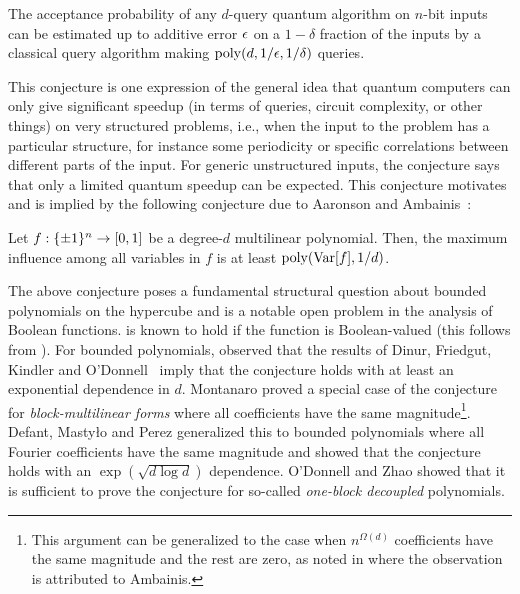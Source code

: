 \begin{conjecture}[Folklore]\label{conj:folklore}
     The acceptance probability of any $d$-query quantum algorithm on $n$-bit inputs can be estimated up to additive error $\epsilon$ on a $1-\delta$ fraction of the inputs by a classical query algorithm making $\mathrm{poly}(d, 1/\epsilon, 1/\delta)$ queries. 
\end{conjecture}

This conjecture is one expression of the general idea that quantum computers can only give significant speedup (in terms of queries, circuit complexity, or other things) on very structured problems, i.e., when the input to the problem has a particular structure, for instance some periodicity or specific correlations between different parts of the input. For generic unstructured inputs, the conjecture says that only a limited quantum speedup can be expected.
This conjecture motivates and is implied by the following conjecture due to Aaronson and Ambainis~\cite{AA14}:


\begin{conjecture}\label{conj:aa-inf}
     Let $f: \{\pm 1\}^n \to [0,1]$ be a degree-$d$ multilinear polynomial. Then, the maximum influence among all variables in $f$ is at least $\mathrm{poly}(\mathrm{Var}[f], 1/d)$.
\end{conjecture}

The above conjecture poses a fundamental structural question about bounded polynomials on the hypercube and is a notable open problem in the analysis of Boolean functions.  is known to hold if the function is Boolean-valued (this follows from \cite{M05,OSS05}). For bounded polynomials, \cite{AA14} observed that the results of Dinur, Friedgut, Kindler and O'Donnell~\cite{DFKO06} imply that the conjecture holds with at least an exponential dependence in $d$. Montanaro \cite{M12} proved a special case of the conjecture for \emph{block-multilinear forms} where all coefficients have the same magnitude\footnote{This argument can be generalized to the case when $n^{\Omega(d)}$ coefficients have the same magnitude and the rest are zero, as noted in \cite{M12} where the observation is  attributed to Ambainis.}. Defant, Masty\l{}o and Perez \cite{DMP18} generalized this to bounded polynomials where all Fourier coefficients have the same magnitude and showed that the conjecture holds with an $\exp(\sqrt{d\log d})$ dependence. O'Donnell and Zhao \cite{OZ16} showed that it is sufficient to prove the conjecture for so-called \emph{one-block decoupled} polynomials. 


